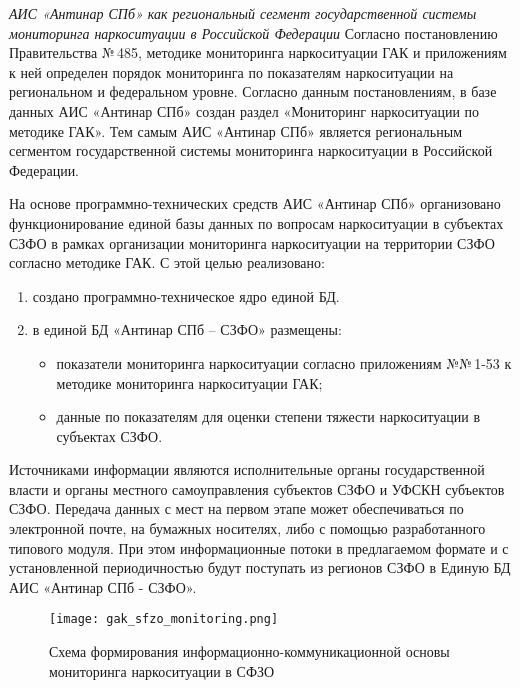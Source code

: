 \textit{АИС «Антинар СПб» как региональный сегмент государственной системы
мониторинга наркоситуации в Российской Федерации}
Согласно постановлению Правительства №\,485, методике мониторинга
наркоситуации ГАК и приложениям к ней определен порядок мониторинга по
показателям наркоситуации на региональном и федеральном уровне. Согласно данным
постановлениям, в базе данных АИС «Антинар СПб» создан раздел «Мониторинг
наркоситуации по методике ГАК». Тем самым АИС «Антинар СПб»
является региональным сегментом государственной системы мониторинга
наркоситуации в Российской Федерации.

На основе программно-технических средств АИС «Антинар СПб» организовано
функционирование единой базы данных по вопросам наркоситуации в субъектах СЗФО в
рамках организации мониторинга наркоситуации на территории СЗФО согласно
методике ГАК. С этой целью реализовано:
\begin{enumerate}
\item создано программно-техническое ядро единой БД.
\item в единой БД «Антинар СПб – СЗФО» размещены:
\begin{itemize}
    \item показатели мониторинга наркоситуации согласно приложениям №№\,1-53 
    к методике мониторинга наркоситуации ГАК; 
    \item данные по показателям для оценки степени тяжести наркоситуации в
        субъектах СЗФО.
\end{itemize}
\end{enumerate}
 Источниками информации являются исполнительные органы государственной
 власти и органы местного самоуправления субъектов СЗФО и УФСКН субъектов СЗФО. 
 Передача данных с мест на первом этапе может обеспечиваться по электронной
 почте, на бумажных носителях, либо с помощью разработанного типового модуля.
 При этом информационные потоки в предлагаемом формате и с установленной
 периодичностью будут поступать из регионов СЗФО в Единую БД АИС «Антинар СПб -
 СЗФО».

\begin{figure}
    \texttt{[image: gak\_sfzo\_monitoring.png]}
    \caption{Схема формирования информационно-коммуникационной основы
    мониторинга наркоситуации в СФЗО}
    \label{fig:gak_sfzo_monitoring}
\end{figure}


